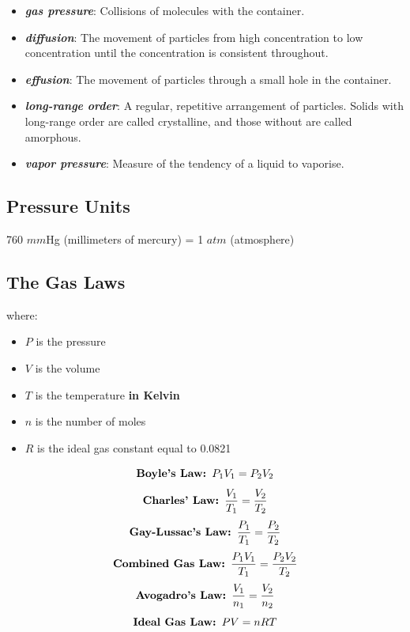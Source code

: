\documentclass[a4paper, 12pt]{article}
\begin{document}
\begin{itemize}[leftmargin=*, nosep]
    \item \textbf{\textit{gas pressure}}: Collisions of molecules with the container.
    \item \textbf{\textit{diffusion}}: The movement of particles from high concentration to low concentration until the concentration is consistent throughout.
    \item \textbf{\textit{effusion}}: The movement of particles through a small hole in the container.
    \item \textbf{\textit{long-range order}}: A regular, repetitive arrangement of particles. Solids with long-range order are called crystalline, and those without are called amorphous.
    \item \textbf{\textit{vapor pressure}}: Measure of the tendency of a liquid to vaporise.
\end{itemize}

\subsection{Pressure Units}
760 $mm$Hg (millimeters of mercury) = 1 $atm$ (atmosphere)

\subsection{The Gas Laws}
where:

\begin{itemize}[leftmargin=*, nosep]
    \item $P$ is the pressure
    \item $V$ is the volume
    \item $T$ is the temperature \textbf{in Kelvin}
    \item $n$ is the number of moles
    \item $R$ is the ideal gas constant equal to 0.0821
\end{itemize}

\begin{equation}\label{boyle}
    \text{\textbf{Boyle's Law: }}P_1V_1 = P_2V_2
\end{equation}
\begin{equation}\label{charles}
    \text{\textbf{Charles' Law: }}\frac{V_1}{T_1} = \frac{V_2}{T_2}
\end{equation}
\begin{equation}\label{gaylussac}
    \text{\textbf{Gay-Lussac's Law: }}\frac{P_1}{T_1} = \frac{P_2}{T_2}
\end{equation}
\begin{equation}\label{combined}
    \text{\textbf{Combined Gas Law: }}\frac{P_1V_1}{T_1} = \frac{P_2V_2}{T_2}
\end{equation}
\begin{equation}\label{avogadro}
    \text{\textbf{Avogadro's Law: }}\frac{V_1}{n_1} = \frac{V_2}{n_2}
\end{equation}
\begin{equation}\label{ideal}
    \text{\textbf{Ideal Gas Law: }}PV = nRT
\end{equation}
\end{document}
